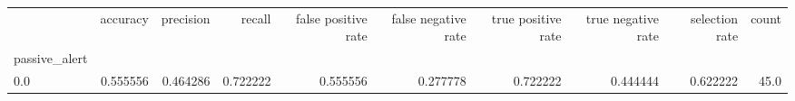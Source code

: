 \begin{tabular}{lrrrrrrrrr}
\toprule
{} &  accuracy &  precision &    recall &  false positive rate &  false negative rate &  true positive rate &  true negative rate &  selection rate &  count \\
passive\_alert &           &            &           &                      &                      &                     &                     &                 &        \\
\midrule
0.0           &  0.555556 &   0.464286 &  0.722222 &             0.555556 &             0.277778 &            0.722222 &            0.444444 &        0.622222 &   45.0 \\
\bottomrule
\end{tabular}
